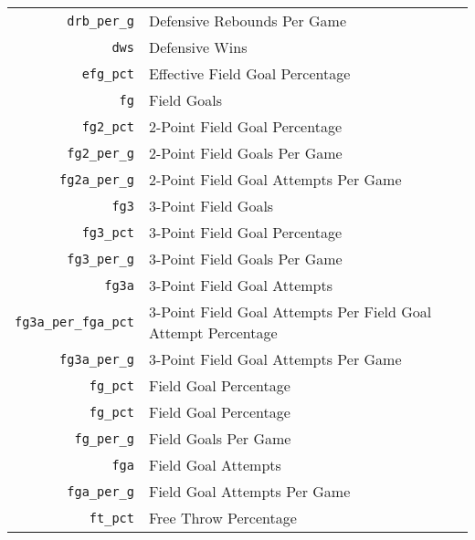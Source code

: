 \begin{table}[H]
\begin{tabular}{rl}
    \texttt{drb\_per\_g}         & Defensive Rebounds Per Game                                   \\
    \texttt{dws}                 & Defensive Wins                                                \\
    \texttt{efg\_pct}            & Effective Field Goal Percentage                               \\
    \texttt{fg}                  & Field Goals                                                   \\
    \texttt{fg2\_pct}            & 2-Point Field Goal Percentage                                 \\
    \texttt{fg2\_per\_g}         & 2-Point Field Goals Per Game                                  \\
    \texttt{fg2a\_per\_g}        & 2-Point Field Goal Attempts Per Game                          \\
    \texttt{fg3}                 & 3-Point Field Goals                                           \\
    \texttt{fg3\_pct}            & 3-Point Field Goal Percentage                                 \\
    \texttt{fg3\_per\_g}         & 3-Point Field Goals Per Game                                  \\
    \texttt{fg3a}                & 3-Point Field Goal Attempts                                   \\
    \texttt{fg3a\_per\_fga\_pct} & 3-Point Field Goal Attempts Per Field Goal Attempt Percentage \\
    \texttt{fg3a\_per\_g}        & 3-Point Field Goal Attempts Per Game                          \\
    \texttt{fg\_pct}             & Field Goal Percentage                                         \\
    \texttt{fg\_pct}             & Field Goal Percentage                                         \\
    \texttt{fg\_per\_g}          & Field Goals Per Game                                          \\
    \texttt{fga}                 & Field Goal Attempts                                           \\
    \texttt{fga\_per\_g}         & Field Goal Attempts Per Game                                  \\
    \texttt{ft\_pct}             & Free Throw Percentage                                         \\

\end{tabular}
\end{table}
